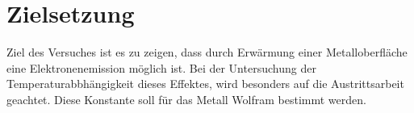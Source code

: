 \section{Zielsetzung}
\label{sec:zielsetzung}
Ziel des Versuches ist es zu zeigen, dass durch Erwärmung einer Metalloberfläche eine Elektronenemission 
möglich ist. Bei der Untersuchung der Temperaturabbhängigkeit dieses Effektes, wird besonders auf die Austrittsarbeit 
geachtet. Diese Konstante soll für das Metall Wolfram bestimmt werden.
